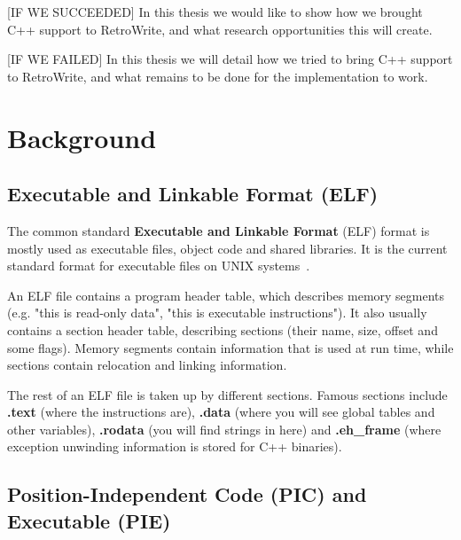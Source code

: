 \documentclass[a4paper,11pt,oneside]{report}
\begin{document}
[IF WE SUCCEEDED]
In this thesis we would like to show how we brought C++ support to RetroWrite, 
and what research opportunities this will create.

[IF WE FAILED]
In this thesis we will detail how we tried to bring C++ support to RetroWrite, 
and what remains to be done for the implementation to work.


\chapter{Background}



\section{Executable and Linkable Format (ELF)}

The common standard \textbf{Executable and Linkable Format} (ELF) format is 
mostly used as executable files, object code and shared libraries.
It is the current standard format for executable files on UNIX
systems~\cite{elfstandard}.

An ELF file contains a program header table, which describes memory segments 
(e.g. "this is read-only data", "this is executable instructions").
It also usually contains a section header table, describing sections (their 
name, size, offset and some flags).
Memory segments contain information that is used at run time, while sections
contain relocation and linking information.

The rest of an ELF file is taken up by different sections.
Famous sections include
\textbf{.text} (where the instructions are),
\textbf{.data} (where you will see global tables and other variables),
\textbf{.rodata} (you will find strings in here)
and \textbf{.eh\_frame} (where exception unwinding information is stored for 
C++ binaries).

\section{Position-Independent Code (PIC) and Executable (PIE)}
\label{picpie}
\end{document}
